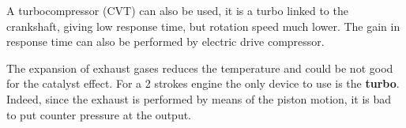 	A turbocompressor (CVT) can also be used, it is a turbo linked to the crankshaft, giving low response time, but rotation speed much lower. The gain in response time can also be performed by electric drive compressor.  
	
	
	The expansion of exhaust gases reduces the temperature and could be not good for the catalyst effect. For a 2 strokes engine the only device to use is the \textbf{turbo}. Indeed, since the exhaust is performed by means of the piston motion, it is bad to put counter pressure at the output. 
	

	